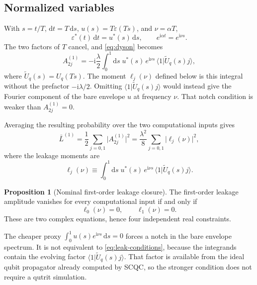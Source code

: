 \documentclass[11pt,a4paper]{article}
\theoremstyle{definition}
\newtheorem{proposition}{Proposition}
\newcommand{\braket}[2]{\langle #1\vert #2\rangle}
\newcommand{\abs}[1]{\lvert #1\rvert}
\newcommand{\dd}{\mathrm{d}}
\newcommand{\ii}{\mathrm{i}}
\newcommand{\eps}{\varepsilon}
\begin{document}
\subsection{Normalized variables}

With \(s=t/T\), \(\dd t=T\,\dd s\), \(u(s)=T\eps(Ts)\), and \(\nu=\alpha T\),
\begin{equation*}
  \eps^*(t)\,\dd t=u^*(s)\,\dd s,
  \qquad
  e^{\ii\alpha t}=e^{\ii\nu s}.
\end{equation*}
The two factors of \(T\) cancel, and \eqref{eq:dyson} becomes
\begin{equation}
  A^{(1)}_{2j}
  =-\ii\frac{\lambda}{2}\int_0^1\dd s\;
    u^*(s)\,e^{\ii\nu s}\,\braket{1}{\tilde U_q(s)j},
\end{equation}
where \(\tilde U_q(s)=U_q(Ts)\).  The moment \(\ell_j(\nu)\) defined below is
this integral without the prefactor \(-\ii\lambda/2\).  Omitting
\(\braket{1}{\tilde U_q(s)j}\) would instead give the Fourier component of the
bare envelope \(u\) at frequency \(\nu\).  That notch condition is weaker than
\(A^{(1)}_{2j}=0\).

Averaging the resulting probability over the two computational inputs gives
\begin{equation}
\label{eq:leak-prob}
  \bar L^{(1)}
  =\frac12\sum_{j=0,1}\abs{A^{(1)}_{2j}}^2
  =\frac{\lambda^2}{8}\sum_{j=0,1}
    \abs{\ell_j(\nu)}^2,
\end{equation}
where the leakage moments are
\begin{equation}
\label{eq:ell}
  \ell_j(\nu)
  \equiv\int_0^1\dd s\;
  u^*(s)\,e^{\ii\nu s}\,\braket{1}{\tilde U_q(s)j}.
\end{equation}

\begin{proposition}[Nominal first-order leakage closure]
\label{prop:leakage}
The first-order leakage amplitude vanishes for every computational input if and
only if
\begin{equation}
\label{eq:leak-conditions}
  \ell_0(\nu)=0,\qquad \ell_1(\nu)=0.
\end{equation}
These are two complex equations, hence four independent real constraints.
\end{proposition}

The cheaper proxy \(\int_0^1 u(s)e^{\ii\nu s}\,\dd s=0\) forces a notch in the
bare envelope spectrum.  It is not equivalent to \eqref{eq:leak-conditions},
because the integrands contain the evolving factor
\(\braket{1}{\tilde U_q(s)j}\).  That factor is available from the ideal qubit
propagator already computed by SCQC, so the stronger condition does not require
a qutrit simulation.
\end{document}
